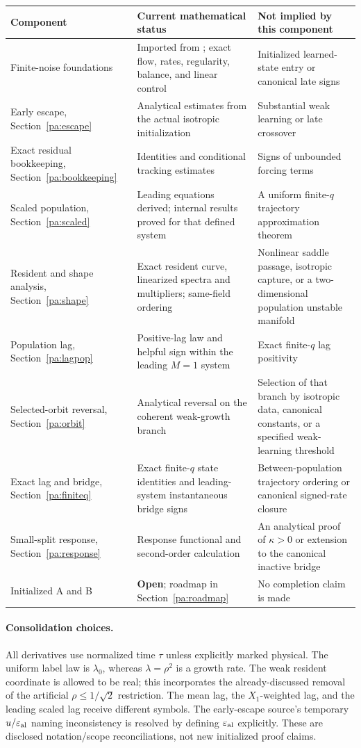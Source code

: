 \documentclass[11pt]{article}
\numberwithin{equation}{section}
\theoremstyle{definition}
\theoremstyle{remark}
\newcommand{\1}{\mathbf 1}
\begin{document}
\begin{longtable}{@{}p{}p{}p{}@{}}
\toprule
Component & Current mathematical status & Not implied by this component\\
\midrule
\endhead
Finite-noise foundations & Imported from \cite{F}; exact flow, rates,
regularity, balance, and linear control & Initialized learned-state entry or
canonical late signs\\
Early escape, Section~\ref{pa:escape} & Analytical estimates from the actual
isotropic initialization & Substantial weak learning or late crossover\\
Exact residual bookkeeping, Section~\ref{pa:bookkeeping} & Identities and
conditional tracking estimates & Signs of unbounded forcing terms\\
Scaled population, Section~\ref{pa:scaled} & Leading equations derived;
internal results proved for that defined system & A uniform finite-$q$
trajectory approximation theorem\\
Resident and shape analysis, Section~\ref{pa:shape} & Exact resident curve,
linearized spectra and multipliers; same-field ordering & Nonlinear saddle
passage, isotropic capture, or a two-dimensional population unstable manifold\\
Population lag, Section~\ref{pa:lagpop} & Positive-lag law and helpful sign
within the leading $M=1$ system & Exact finite-$q$ lag positivity\\
Selected-orbit reversal, Section~\ref{pa:orbit} & Analytical reversal on the
coherent weak-growth branch & Selection of that branch by isotropic data,
canonical constants, or a specified weak-learning threshold\\
Exact lag and bridge, Section~\ref{pa:finiteq} & Exact finite-$q$ state
identities and leading-system instantaneous bridge signs & Between-population
trajectory ordering or canonical signed-rate closure\\
Small-split response, Section~\ref{pa:response} & Response functional and
second-order calculation & An analytical proof of $\kappa>0$ or extension to
the canonical inactive bridge\\
Initialized A and B & \textbf{Open}; roadmap in Section~\ref{pa:roadmap} & No
completion claim is made\\
\bottomrule
\end{longtable}

\paragraph{Consolidation choices.}
All derivatives use normalized time $\tau$ unless explicitly marked physical.
The uniform label law is $\lambda_0$, whereas $\lambda=\rho^2$ is a growth
rate. The weak resident coordinate is allowed to be real; this incorporates
the already-discussed removal of the artificial $\rho\le1/\sqrt2$ restriction.
The mean lag, the $X_1$-weighted lag, and the leading scaled lag receive
different symbols. The early-escape source's temporary $u/\varepsilon_{
\rm al}$ naming inconsistency is resolved by defining $\varepsilon_{\rm al}$
explicitly. These are disclosed notation/scope reconciliations, not new
initialized proof claims.
\end{document}
